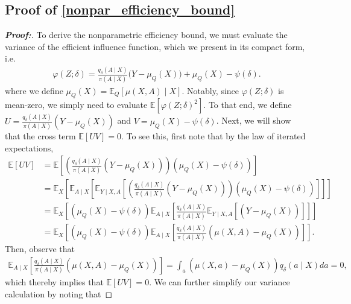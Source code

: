\documentclass[11pt,twoside]{article}
\theoremstyle{definition}
\theoremstyle{remark}
\begin{document}
\subsection{Proof of \texorpdfstring{\cref{nonpar_efficiency_bound}}{Theorem 1}} \label{nonpar_efficiency_bound_proof}
\begin{proof}[\textbf{Proof:}]
    To derive the nonparametric efficiency bound, we must evaluate the variance of the efficient influence function, which we present in its compact form, i.e. 
    \begin{align*}
        \varphi(Z; \delta) = \frac{q_\delta(A \mid X)}{\pi(A \mid X)} \Big(Y - \mu_Q(X) \Big) + \mu_Q(X) - \psi(\delta).
    \end{align*}
where we define $\mu_Q(X) = \mathbb{E}_Q[ \mu(X, A) \mid X]$. Notably, since $\varphi(Z; \delta)$ is mean-zero, we simply need to evaluate $\mathbb{E}[\varphi(Z; \delta)^2]$. To that end, we define $U = \frac{q_\delta(A \mid X)}{\pi(A \mid X)} (Y - \mu_Q(X))$ and $V =  \mu_Q(X) - \psi(\delta)$. Next, we will show that the cross term $\mathbb{E}[UV] = 0$. To see this, first note that by the law of iterated expectations,
\begin{align*}
    \mathbb{E}[UV] &= \mathbb{E}\left[\left(\frac{q_\delta(A \mid X)}{\pi(A \mid X)} (Y - \mu_Q(X)) \right) \left(\mu_Q(X) - \psi(\delta) \right) \right] \\
    &= \mathbb{E}_X\left[ \mathbb{E}_{A \mid X}\left[ \mathbb{E}_{Y \mid X, A}\left[\left(\frac{q_\delta(A \mid X)}{\pi(A \mid X)} (Y - \mu_Q(X)) \right) \left(\mu_Q(X) - \psi(\delta) \right)  \right]\right] \right] \\
    &= \mathbb{E}_X\left[\left(\mu_Q(X) - \psi(\delta) \right)  \mathbb{E}_{A \mid X}\left[ \frac{q_\delta(A \mid X)}{\pi(A \mid X)}\mathbb{E}_{Y \mid X, A}\left[\left(Y - \mu_Q(X) \right)   \right]\right] \right] \\
    &= \mathbb{E}_X\left[\left(\mu_Q(X) - \psi(\delta) \right)  \mathbb{E}_{A \mid X}\left[ \frac{q_\delta(A \mid X)}{\pi(A \mid X)} \left( \mu(X, A) - \mu_Q(X) \right) \right] \right].
\end{align*}
Then, observe that
\begin{align*}
    \mathbb{E}_{A \mid X}\left[ \frac{q_\delta(A \mid X)}{\pi(A \mid X)} \left( \mu(X, A) - \mu_Q(X) \right) \right] = \int_a \left(\mu(X, a) - \mu_Q(X) \right) q_\delta(a \mid X) da = 0,
\end{align*}
which thereby implies that $\mathbb{E}[UV] = 0$. We can further simplify our variance calculation by noting that 

\end{proof}
\end{document}
